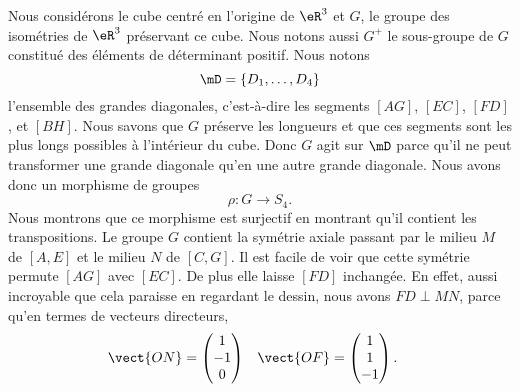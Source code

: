 \begin{wrapfigure}{r}{6.0cm}
	\vspace{-0.5cm}        %
	\centering
	
\end{wrapfigure}
Nous considérons le cube centré en l'origine de \( \eR^3\) et \( G\), le groupe des isométries de \( \eR^3\) préservant ce cube. Nous notons aussi \( G^+\) le sous-groupe de \( G\) constitué des éléments de déterminant positif. Nous notons
\begin{equation}
	\mD=\{ D_1,\ldots, D_4 \}
\end{equation}
l'ensemble des grandes diagonales, c'est-à-dire les segments \( [AG]\), \( [EC]\), \( [FD]\), et \( [BH]\). Nous savons que \( G\) préserve les longueurs et que ces segments sont les plus longs possibles à l'intérieur du cube. Donc \( G\) agit sur \( \mD\) parce qu'il ne peut transformer une grande diagonale qu'en une autre grande diagonale. Nous avons donc un morphisme de groupes
\begin{equation}
	\rho\colon G\to S_4.
\end{equation}
Nous montrons que ce morphisme est surjectif en montrant qu'il contient les transpositions. Le groupe \( G\) contient la symétrie axiale passant par le milieu \( M\) de \( [A,E]\) et le milieu \( N\) de \( [C,G]\). Il est facile de voir que cette symétrie permute \( [AG]\) avec \( [EC]\). De plus elle laisse \( [FD]\) inchangée. En effet, aussi incroyable que cela paraisse en regardant le dessin, nous avons \( FD\perp MN\), parce qu'en termes de vecteurs directeurs,
\begin{equation}
	\begin{aligned}[]
		\vect{ ON } & =\begin{pmatrix}
			               1  \\
			               -1 \\
			               0
		               \end{pmatrix} & \vect{ OF } & =\begin{pmatrix}
			                                              1 \\
			                                              1 \\
			                                              -1
		                                              \end{pmatrix}.
	\end{aligned}
\end{equation}

